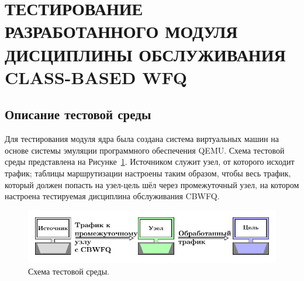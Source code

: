 \section{ТЕСТИРОВАНИЕ РАЗРАБОТАННОГО МОДУЛЯ ДИСЦИПЛИНЫ ОБСЛУЖИВАНИЯ CLASS-BASED WFQ}

	\subsection{Описание тестовой среды}

		Для тестирования модуля ядра была создана система виртуальных машин на основе
		системы эмуляции программного обеспечения QEMU. Схема тестовой среды представлена
		на Рисунке~\ref{pic:testscheme}. Источником служит узел, от которого исходит трафик;
		таблицы маршрутизации настроены таким образом, чтобы весь трафик, который
		должен попасть на узел-цель шёл через промежуточный узел, на котором
		настроена тестируемая дисциплина обслуживания CBWFQ.

        \begin{figure}[ht!]
        	\center
        	\includegraphics[scale=1.2]{pdfimages/test_scheme.pdf}
        	\caption{Схема тестовой среды.}
			\label{pic:testscheme}
        \end{figure}

